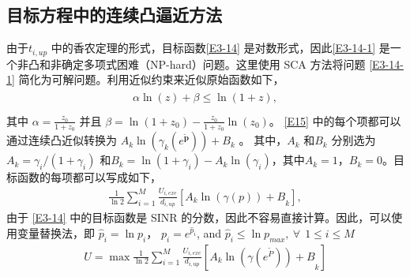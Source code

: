 \subsection{目标方程中的连续凸逼近方法}\label{section3-3-1}
由于$t_{i,up}$ 中的香农定理的形式，目标函数\eqref{E3-14} 是对数形式，因此\eqref{E3-14-1} 是一个非凸和非确定多项式困难（NP-hard）问题。这里使用 SCA 方法将问题 \eqref{E3-14-1} 简化为可解问题。利用近似约束来近似原始函数如下，
\begin{eqnarray}\label{E15}
\begin{array}{ll}
\alpha \ln{\left(z\right)}+\beta\le \ln{\left(1+z\right)},\\
\end{array}
\end{eqnarray}
其中 $\alpha=\frac{z_0}{1+z_0}$ 并且 $\beta=\ln{\left(1+z_0\right)}-\frac{z_0}{1+z_0}\ln{\left(z_0\right)}$。 \eqref{E15} 中的每个项都可以通过连续凸近似转换为 $A_k\ln\left(\gamma_k\left(e^{\widetilde{\mathbf{p}}}\right)\right)+B_k$ 。 其中，$A_k$ 和$B_k$ 分别选为$A_k=\gamma_i/\left(1+\gamma_i\right)$ 和$B_k=\ln{\left(1+\gamma_i\right)}-A_k\ln{\left(\gamma_i\right)}$，其中$A_k=1$，$B_k=0$。目标函数的每项都可以写成如下，
\begin{eqnarray}\label{E16}
\frac{1}{\ln{2}}\sum_{i=1}^{M}{\frac{U_{i,exe}}{d_{i,up}}\left.\left[{A_k\ln{\left(\gamma\left(p\right)\right)}+B}_k\right.\right]},
\end{eqnarray}
由于 \eqref{E3-14} 中的目标函数是 SINR 的分数，因此不容易直接计算。因此，可以使用变量替换法，即 ${\hat{p}}_i=\ln{p_i}$，
$p_i=e^{{\hat{p}}_i}$, and ${\hat{p}}_i\le \ln{p_{max}},\ \forall\ \ 1\le i\le M$
\begin{eqnarray}\label{E17}
U=\max\frac{1}{\ln{2}}\sum_{i=1}^{M}\left.\frac{U_{i,exe}}{d_{i,up}}\left[{A_k\ln{\left(\gamma\left(e^{\widetilde{P}}\right)\right)}+B}_k\right.\right]
\end{eqnarray}

